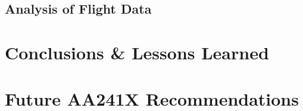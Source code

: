 \documentclass[11pt]{article}
\begin{document}
	\subsection{Analysis of Flight Data}
	\label{AnalFltData}


\section{Conclusions \& Lessons Learned}
	\label{Conclusion}

\section{Future AA241X Recommendations}
	\label{Recommendations}
\end{document}
